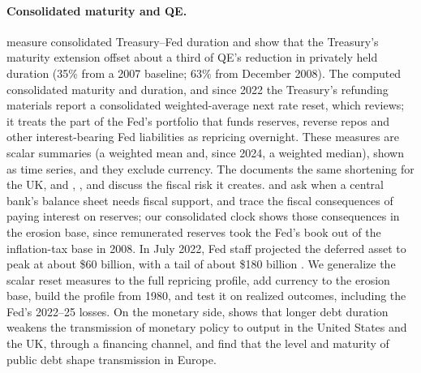 \paragraph{Consolidated maturity and QE.} \citet{greenwood2014} measure consolidated Treasury--Fed duration and show that the Treasury's maturity extension offset about a third of QE's reduction in privately held duration (35\% from a 2007 baseline; 63\% from December 2008). The \citet{tbac2020} computed consolidated maturity and duration, and since 2022 the Treasury's refunding materials report a consolidated weighted-average next rate reset, which \citet{tbac2026} reviews; it treats the part of the Fed's portfolio that funds reserves, reverse repos and other interest-bearing Fed liabilities as repricing overnight. These measures are scalar summaries (a weighted mean and, since 2024, a weighted median), shown as time series, and they exclude currency. The \citet{obr2021} documents the same shortening for the UK, and \citet{cbo2022}, \citet{levin2022}, \citet{cavallo2019} and \citet{davernas2024} discuss the fiscal risk it creates. \citet{delnegro2015} and \citet{hall2015} ask when a central bank's balance sheet needs fiscal support, and \citet{bassetto2013} trace the fiscal consequences of paying interest on reserves; our consolidated clock shows those consequences in the erosion base, since remunerated reserves took the Fed's book out of the inflation-tax base in 2008. In July 2022, Fed staff projected the deferred asset to peak at about \$60 billion, with a tail of about \$180 billion \citep{anderson2022}. We generalize the scalar reset measures to the full repricing profile, add currency to the erosion base, build the profile from 1980, and test it on realized outcomes, including the Fed's 2022--25 losses. On the monetary side, \citet{andreolli2024} shows that longer debt duration weakens the transmission of monetary policy to output in the United States and the UK, through a financing channel, and \citet{johns2026} find that the level and maturity of public debt shape transmission in Europe.

